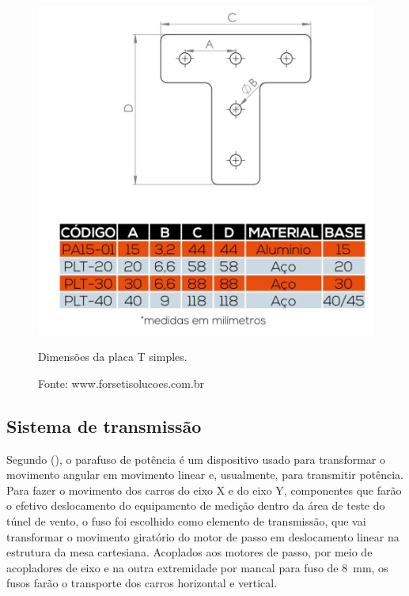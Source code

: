 \begin{figure}[H]
\centering
\includegraphics[scale = 0.4]{figuras/placatd}
\caption{Dimensões da placa T simples.}
\caption*{Fonte: www.forsetisolucoes.com.br}
\label{fig:placatd}
\end{figure}

\subsection{Sistema de transmissão}\label{subsec:mettransmissao}

Segundo \citeauthor{budynas2016elementos} (\citeyear{budynas2016elementos}), o parafuso de potência 
é um dispositivo usado para transformar o movimento angular em movimento linear e, usualmente, 
para transmitir potência. Para fazer o movimento dos carros do eixo X e do eixo Y, 
componentes que farão o efetivo deslocamento do equipamento de medição dentro da área de 
teste do túnel de vento, o fuso foi escolhido como elemento de transmissão, que vai transformar 
o movimento giratório do motor de passo em deslocamento linear na estrutura da mesa cartesiana. 
Acoplados aos motores de passo, por meio de acopladores de eixo e na outra extremidade por mancal para fuso 
de 8~mm, os fusos farão o transporte dos carros horizontal e vertical. 

